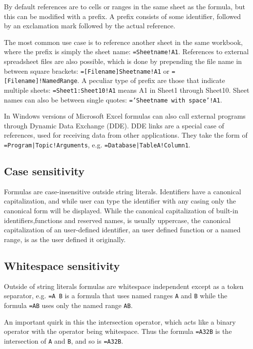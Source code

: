 \documentclass[12pt,a4paper,onecolumn,oneside]{memoir}
\newcommand{\f}[1]{\texttt{#1}}
\begin{document}
By default references are to cells or ranges in the same sheet as the formula, but this can be modified with a prefix. A prefix consists of some identifier, followed by an exclamation mark followed by the actual reference.

The most common use case is to reference another sheet in the same workbook, where the prefix is simply the sheet name: \f{=Sheetname!A1}.
References to external spreadsheet files are also possible, which is done by prepending the file name in between square brackets: \f{=[Filename]Sheetname!A1} or \f{=[Filename]!NamedRange}.
A peculiar type of prefix are those that indicate multiple sheets: \f{=Sheet1:Sheet10!A1} means A1 in Sheet1 through Sheet10.
Sheet names can also be between single quotes: \f{='Sheetname with space'!A1}. 

In Windows versions of Microsoft Excel formulas can also call external programs through Dynamic Data Exchange (DDE).
DDE links are a special case of references, used for receiving data from other applications.
They take the form of \f{=Program|Topic!Arguments}, e.g. \f{=Database|TableA!Column1}.

\subsection{Case sensitivity}

Formulas are case-insensitive outside string literals.
Identifiers have a canonical capitalization, and while user can type the identifier with any casing only the canonical form will be displayed.
While the canonical capitalization of built-in identifiers,functions and reserved names, is usually uppercase, the canonical capitalization of an user-defined identifier, an user defined function or a named range, is as the user defined it originally.

\subsection{Whitespace sensitivity}

Outside of string literals formulas are whitespace independent except as a token separator, e.g. \f{=A B} is a formula that uses named ranges \f{A} and \f{B} while the formula \f{=AB} uses only the named range \f{AB}.

An important quirk in this the intersection operator, which acts like a binary operator with the operator being whitespace.
Thus the formula \f{=A\char32B} is the intersection of \f{A} and \f{B}, and so is \f{=A\char32\char32\char32B}.
\end{document}
